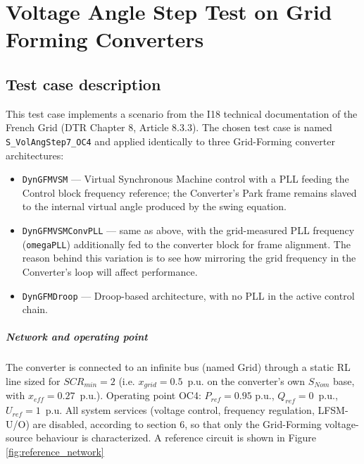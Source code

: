 \documentclass[a4paper, 12pt]{report}
\begin{document}
\chapter*{Voltage Angle Step Test on Grid Forming Converters}
\section*{Test case description}
This test case implements a scenario from the I18 technical documentation of the French Grid (DTR Chapter 8, Article 8.3.3). The chosen test case is named \texttt{S\_VolAngStep7\_OC4} and applied identically to three Grid-Forming
converter architectures:
\begin{itemize}
\item \texttt{DynGFMVSM} --- Virtual Synchronous Machine control with a PLL feeding the
      Control block frequency reference; the Converter's Park frame remains
      slaved to the internal virtual angle produced by the swing equation.
\item \texttt{DynGFMVSMConvPLL} --- same as above, with the grid-measured PLL frequency
      (\texttt{omegaPLL}) additionally fed to the converter block for frame alignment. The reason behind this variation is to see how mirroring the grid frequency in the Converter's loop will affect performance.
\item \texttt{DynGFMDroop} --- Droop-based architecture, with no PLL in the active control chain.
\end{itemize}

\paragraph{Network and operating point}
The converter is connected to an infinite bus (named Grid) through a static RL line sized for
$SCR_{min} = 2$ (i.e. $x_{grid} = 0.5$~p.u. on the converter's own $S_{Nom}$ base, with $x_{eff} = 0.27$~p.u.).
Operating point OC4: $P_{ref} = 0.95$ p.u., $Q_{ref} = 0$~p.u., $U_{ref}= 1$~p.u.
All system services (voltage control, frequency regulation, LFSM-U/O) are disabled,
according to section 6, so that only the Grid-Forming voltage-source behaviour is
characterized. A reference circuit is shown in Figure \ref{fig:reference_network}
\end{document}
